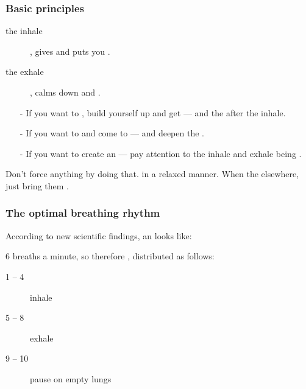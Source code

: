 \begin{frame}
\frametitle{Basic principles}

\begin{description}
\item[the inhale] , gives  and puts you .
\item[the exhale] , calms down and .
  \end{description}

\begin{itemize}
\item[-] If you want to , build yourself up and get  ---  and the  after the inhale.
\item[-] If you want to  and come to  ---  and deepen the .
  \item[-] If you want to create an  --- pay attention to the inhale and exhale being .
\end{itemize}

Don't force anything by doing that.  in a relaxed manner. When the  elsewhere, just bring them .
\end{frame}


\begin{frame}
  \frametitle{The optimal breathing rhythm}

  According to new scientific findings, an  looks like:

  6 breaths a minute, so therefore , distributed as follows:

  \begin{description}
  \item[1 -- 4] inhale
  \item[5 -- 8] exhale
    \item[9 -- 10] pause on empty lungs
    \end{description}
\end{frame}

